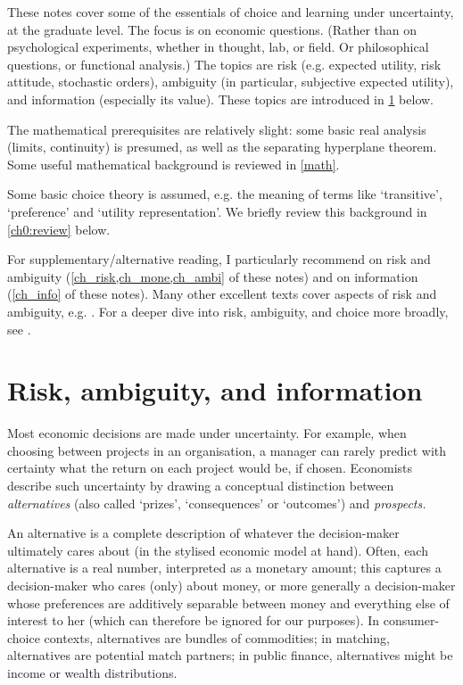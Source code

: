 \documentclass[11pt,letterpaper,reqno,oneside]{book}
\begin{document}
These notes cover some of the essentials of choice and learning under uncertainty, at the graduate level. The focus is on economic questions. (Rather than on psychological experiments, whether in thought, lab, or field. Or philosophical questions, or functional analysis.) The topics are risk (e.g. expected utility, risk attitude, stochastic orders), ambiguity (in particular, subjective expected utility), and information (especially its value). These topics are introduced in \cref{ch0:overview} below.

The mathematical prerequisites are relatively slight: some basic real analysis (limits, continuity) is presumed, as well as the separating hyperplane theorem. Some useful mathematical background is reviewed in \cref{math}.

Some basic choice theory is assumed, e.g. the meaning of terms like `transitive', `preference' and `utility representation'. We briefly review this background in \cref{ch0:review} below.

For supplementary/alternative reading, I particularly recommend \textcite{Kreps1988,Strzalecki2023} on risk and ambiguity (\cref{ch_risk,ch_mone,ch_ambi} of these notes) and \textcite{Liang2023} on information (\cref{ch_info} of these notes). Many other excellent texts cover aspects of risk and ambiguity, e.g. \textcite{MascolellWhinstonGreen1995,Gollier2001,Gilboa2009,Rubinstein2012,Kreps2013,Sarver2023}. For a deeper dive into risk, ambiguity, and choice more broadly, see \textcite{Fishburn1979}.



\section{Risk, ambiguity, and information}
\label{ch0:overview}

Most economic decisions are made under uncertainty. For example, when choosing between projects in an organisation, a manager can rarely predict with certainty what the return on each project would be, if chosen. Economists describe such uncertainty by drawing a conceptual distinction between \emph{alternatives} (also called `prizes', `consequences' or `outcomes') and \emph{prospects.}

An alternative is a complete description of whatever the decision-maker ultimately cares about (in the stylised economic model at hand). Often, each alternative is a real number, interpreted as a monetary amount; this captures a decision-maker who cares (only) about money, or more generally a decision-maker whose preferences are additively separable between money and everything else of interest to her (which can therefore be ignored for our purposes). In consumer-choice contexts, alternatives are bundles of commodities; in matching, alternatives are potential match partners; in public finance, alternatives might be income or wealth distributions.
\end{document}
